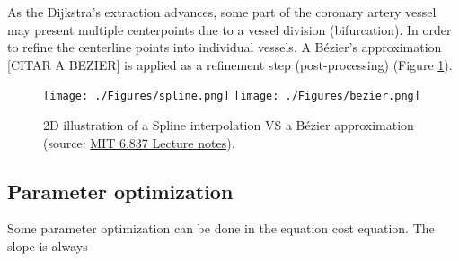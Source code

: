 As the Dijkstra's extraction advances, some part of the coronary artery vessel may present multiple centerpoints due to a vessel division (bifurcation). In order to refine the centerline points into individual vessels. A B\'ezier's approximation [CITAR A BEZIER] is applied as a refinement step (post-processing) (Figure \ref{fig:sp_vs_bz}). 

\begin{figure}[ht]
	\centering
		\texttt{[image: ./Figures/spline.png]}
		\texttt{[image: ./Figures/bezier.png]}
	\caption[Spline interpolation VS B\'ezier approximation]{2D illustration of a Spline interpolation VS a B\'ezier approximation  (source: \href{http://ocw.mit.edu/courses/electrical-engineering-and-computer-science/6-837-computer-graphics-fall-2003/index.htm}{MIT 6.837 Lecture notes}).}
	\label{fig:sp_vs_bz}
\end{figure}


\subsection{Parameter optimization}

Some parameter optimization can be done in the equation cost equation. The slope is always

